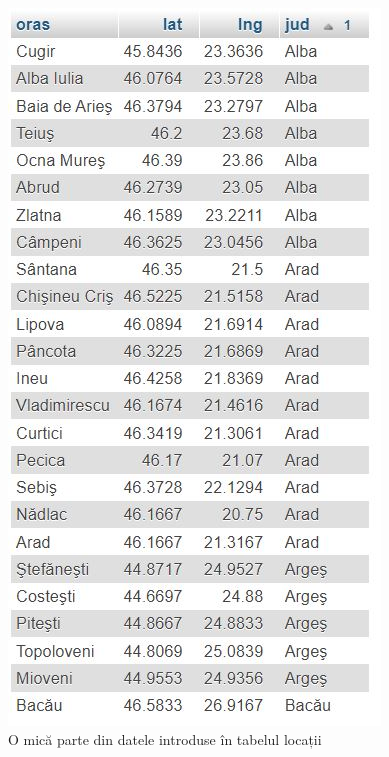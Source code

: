 \documentclass[12pt,a4paper]{report}
\begin{document}
\\
\begin{figure}[H]
\centering
  \includegraphics[width=0.6\linewidth]{./imagini/locatii.jpg}
  \caption{O mică parte din datele introduse în tabelul locații}
\end{figure}
\end{document}
